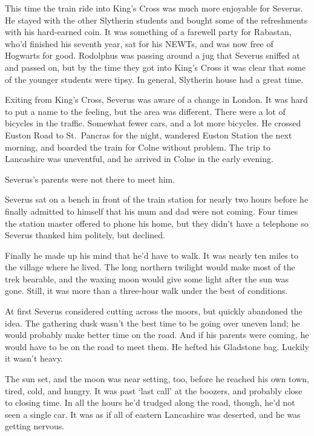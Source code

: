 This time the train ride into King's Cross was much more enjoyable for Severus. He stayed with the other Slytherin students and bought some of the refreshments with his hard-earned coin. It was something of a farewell party for Rabastan, who'd finished his seventh year, sat for his NEWTs, and was now free of Hogwarts for good. Rodolphus was passing around a jug that Severus sniffed at and passed on, but by the time they got into King's Cross it was clear that some of the younger students were tipsy. In general, Slytherin house had a great time.

Exiting from King's Cross, Severus was aware of a change in London. It was hard to put a name to the feeling, but the area was different. There were a lot of bicycles in the traffic. Somewhat fewer cars, and a lot more bicycles. He crossed Euston Road to St.~Pancras for the night, wandered Euston Station the next morning, and boarded the train for Colne without problem. The trip to Lancashire was uneventful, and he arrived in Colne in the early evening.

Severus's parents were not there to meet him.

Severus sat on a bench in front of the train station for nearly two hours before he finally admitted to himself that his mum and dad were not coming. Four times the station master offered to phone his home, but they didn't have a telephone so Severus thanked him politely, but declined.

Finally he made up his mind that he'd have to walk. It was nearly ten miles to the village where he lived. The long northern twilight would make most of the trek bearable, and the waxing moon would give some light after the sun was gone. Still, it was more than a three-hour walk under the best of conditions.

At first Severus considered cutting across the moors, but quickly abandoned the idea. The gathering dusk wasn't the best time to be going over uneven land; he would probably make better time on the road. And if his parents were coming, he would have to be on the road to meet them. He hefted his Gladstone bag. Luckily it wasn't heavy.

The sun set, and the moon was near setting, too, before he reached his own town, tired, cold, and hungry. It was past `last call' at the boozers, and probably close to closing time. In all the hours he'd trudged along the road, though, he'd not seen a single car. It was as if all of eastern Lancashire was deserted, and he was getting nervous.

